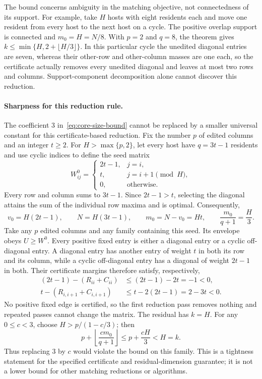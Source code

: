 \documentclass[11pt]{article}
\begin{document}
The bound concerns ambiguity in the matching objective, not connectedness of its support. For example, take $H$ hosts with eight residents each and move one resident from every host to the next host on a cycle. The positive overlap support is connected and $m_0=H=N/8$. With $p=2$ and $q=8$, the theorem gives $k\le\min\{H,2+\lfloor H/3\rfloor\}$. In this particular cycle the unedited diagonal entries are seven, whereas their other-row and other-column masses are one each, so the certificate actually removes every unedited diagonal and leaves at most two rows and columns. Support-component decomposition alone cannot discover this reduction.

\paragraph{Sharpness for this reduction rule.}
The coefficient $3$ in~\eqref{eq:core-size-bound} cannot be replaced by a smaller universal constant for this certificate-based reduction. Fix the number $p$ of edited columns and an integer $t\ge2$. For $H>\max\{p,2\}$, let every host have $q=3t-1$ residents and use cyclic indices to define the seed matrix
\begin{equation}
W^0_{ij}=\begin{cases}2t-1,&j=i,\\t,&j=i+1\pmod H,\\0,&\text{otherwise}.\end{cases}
\end{equation}
Every row and column sums to $3t-1$. Since $2t-1>t$, selecting the diagonal attains the sum of the individual row maxima and is optimal. Consequently,
\begin{equation}
v_0=H(2t-1),\qquad N=H(3t-1),\qquad m_0=N-v_0=Ht,\qquad \frac{m_0}{q+1}=\frac H3.
\end{equation}
Take any $p$ edited columns and any family containing this seed. Its envelope obeys $U\ge W^0$. Every positive fixed entry is either a diagonal entry or a cyclic off-diagonal entry. A diagonal entry has another entry of weight $t$ in both its row and its column, while a cyclic off-diagonal entry has a diagonal of weight $2t-1$ in both. Their certificate margins therefore satisfy, respectively,
\begin{align}
(2t-1)-(R_{ii}+C_{ii})&\le(2t-1)-2t=-1<0,\\
t-(R_{i,i+1}+C_{i,i+1})&\le t-2(2t-1)=2-3t<0.
\end{align}
No positive fixed edge is certified, so the first reduction pass removes nothing and repeated passes cannot change the matrix. The residual has $k=H$. For any $0\le c<3$, choose $H>p/(1-c/3)$; then
\begin{equation}
p+\left\lfloor\frac{c m_0}{q+1}\right\rfloor\le p+\frac{cH}{3}<H=k.
\end{equation}
Thus replacing $3$ by $c$ would violate the bound on this family. This is a tightness statement for the specified certificate and residual-dimension guarantee; it is not a lower bound for other matching reductions or algorithms.
\end{document}
